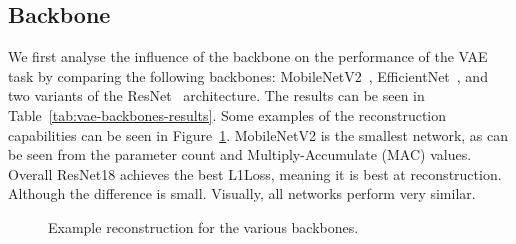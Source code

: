 \subsection{Backbone}
We first analyse the influence of the backbone on the performance of the VAE task by comparing the following backbones: MobileNetV2~\cite{sandler2019mobilenetv2invertedresidualslinear}, EfficientNet~\cite{tan2020efficientnetrethinkingmodelscaling}, and two variants of the ResNet~\cite{he2015deep} architecture. The results can be seen in Table~\ref{tab:vae-backbones-results}. Some examples of the reconstruction capabilities can be seen in Figure~\ref{fig:vae-backbones}. MobileNetV2 is the smallest network, as can be seen from the parameter count and Multiply-Accumulate (MAC) values. Overall ResNet18 achieves the best L1Loss, meaning it is best at reconstruction. Although the difference is small. Visually, all networks perform very similar.

\begin{figure}[h]
    \centering
     \quad
    \caption{Example reconstruction for the various backbones.}
    \label{fig:vae-backbones}
\end{figure}

